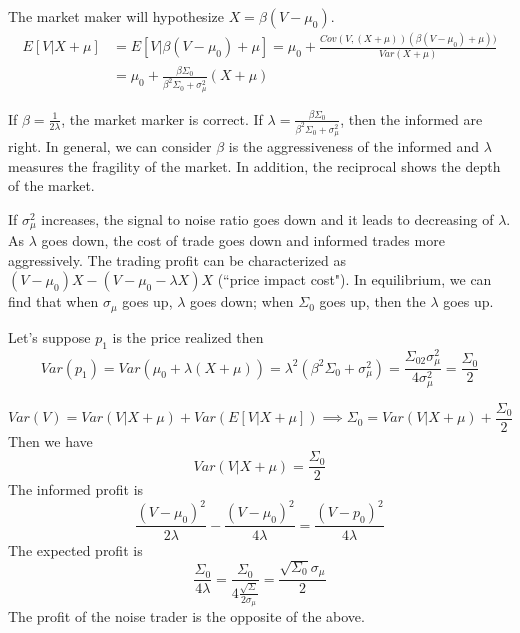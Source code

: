 \documentclass[11pt, a4paper, oneside]{article}
\theoremstyle{definition}
\theoremstyle{proposition}
\theoremstyle{corollary}
\theoremstyle{lemma}
\theoremstyle{theorem}
\begin{document}
The market maker will hypothesize $X = \beta(V - \mu_0)$. 
\begin{align*}
E[V|X+\mu] &= E[V|\beta(V - \mu_0) + \mu] = \mu_0 +\frac{Cov(V, (X+\mu)) (\beta(V- \mu_0) + \mu))}{Var(X+\mu)} \\ 
&=\mu_0 + \frac{\beta \Sigma_0}{\beta^2\Sigma_0 + \sigma^2_{\mu}}(X + \mu) 
\end{align*}

If $\beta = \frac{1}{2\lambda}$, the market marker is correct. If $\lambda = \frac{\beta \Sigma_0}{\beta^2 \Sigma_0 + \sigma_{\mu}^2}$, then the informed are right. In general, we can consider $\beta$ is the aggressiveness of the informed and $\lambda$ measures the fragility of the market. In addition, the reciprocal shows the depth of the market. 

If $\sigma_{\mu}^2$ increases, the signal to noise ratio goes down and it leads to decreasing of $\lambda$. As $\lambda$ goes down, the cost of trade goes down and informed trades more aggressively. The trading profit can be characterized as $(V- \mu_0)X - (V - \mu_0 - \lambda X)X$ (``price impact cost"). In equilibrium, we can find that when $\sigma_{\mu}$ goes up, $\lambda$ goes down; when $\Sigma_0$ goes up, then the $\lambda$ goes up. 

Let's suppose $p_1$ is the price realized then
$$Var(p_1) = Var(\mu_0 + \lambda(X+\mu)) = \lambda^2(\beta^2 \Sigma_0 + \sigma_{\mu}^2) = \frac{\Sigma_02\sigma_{\mu}^2}{4\sigma_{\mu}^2} = \frac{\Sigma_0}{2}$$  

$$Var(V) = Var(V|X+\mu) + Var(E[V|X+\mu]) \implies  \Sigma_0 = Var(V|X+\mu) + \frac{\Sigma_0}{2}$$
Then we have
$$Var(V|X+\mu) = \frac{\Sigma_0}{2}$$
The informed profit is 
$$\frac{(V - \mu_0)^2}{2\lambda} - \frac{(V- \mu_0)^2}{4\lambda} = \frac{(V- p_0)^2}{4\lambda}$$ 
The expected profit is
$$\frac{\Sigma_0}{4\lambda} = \frac{\Sigma_0}{4\frac{\sqrt{\Sigma}}{2\sigma_{\mu}}} = \frac{\sqrt{\Sigma_0} \sigma_{\mu}}{2}$$
The profit of the noise trader is the opposite of the above. 
\end{document}
